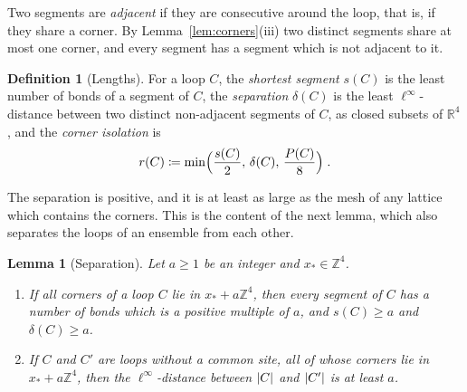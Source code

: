 \documentclass[11pt]{preprint}
\DeclarePairedDelimiter{\abs}{\lvert}{\rvert}
\numberwithin{equation}{section}
\newtheorem{lemma}[theorem]{Lemma}
\theoremstyle{definition}
\newtheorem{definition}[theorem]{Definition}
\theoremstyle{remark}
\theoremstyle{plain}
\begin{document}
Two segments are \emph{adjacent} if they are consecutive around the loop, that is, if they share a corner. By Lemma~\ref{lem:corners}(iii) two distinct segments share at most one corner, and every segment has a segment which is not adjacent to it.

\begin{definition}[Lengths]\label{def:lengths}
For a loop $C$, the \emph{shortest segment} $s(C)$ is the least number of bonds of a segment of $C$, the \emph{separation} $\delta(C)$ is the least $\ell^\infty$-distance between two distinct non-adjacent segments of $C$, as closed subsets of $\mathbb R^4$, and the \emph{corner isolation} is
\begin{equation}\label{eq:corner-isolation}
    r(C) \coloneqq \min\Bigl(\frac{s(C)}{2},\, \delta(C),\, \frac{P(C)}{8}\Bigr)\;.
\end{equation}
\end{definition}

The separation is positive, and it is at least as large as the mesh of any lattice which contains the corners. This is the content of the next lemma, which also separates the loops of an ensemble from each other.

\begin{lemma}[Separation]\label{lem:separation}
Let $a \geq 1$ be an integer and $x_* \in \mathbb Z^4$.
\begin{enumerate}[label=(\roman*)]
\item If all corners of a loop $C$ lie in $x_* + a\mathbb Z^4$, then every segment of $C$ has a number of bonds which is a positive multiple of $a$, and $s(C) \geq a$ and $\delta(C) \geq a$.
\item If $C$ and $C'$ are loops without a common site, all of whose corners lie in $x_* + a\mathbb Z^4$, then the $\ell^\infty$-distance between $\abs{C}$ and $\abs{C'}$ is at least $a$.
\end{enumerate}
\end{lemma}
\end{document}
